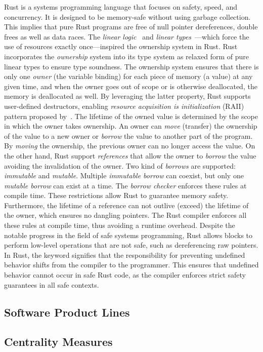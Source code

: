 Rust is a systems programming language that focuses on safety, speed, and concurrency. It is designed to be memory-safe without using garbage collection. 
This implies that pure Rust programs are free of null pointer dereferences, double frees as well as data races.
The \emph{linear logic}~\cite{Girard87, Girard95} and \emph{linear types}~\cite{Wadler90, Odersky92}---which force the use of resources exactly once---inspired the ownership system in Rust.
Rust incorporates the \emph{ownership} system into its type system as relaxed form of pure linear types to ensure type soundness.
The ownership system ensures that there is only one \emph{owner} (the variable binding) for each piece of memory (a value) at any given time, and when the owner goes out of scope or is otherwise deallocated, the memory is deallocated as well. By leveraging the latter property, Rust supports user-defined destructors, enabling \emph{resource acquisition is initialization} (RAII) pattern proposed by~\citet{Stroustrup94}.
The lifetime of the owned value is determined by the scope in which the owner takes ownership.
An owner can \emph{move} (transfer) the ownership of the value to a new owner or \emph{borrow} the value to another part of the program.
By \emph{moving} the ownership, the previous owner can no longer access the value.
On the other hand, Rust support \emph{references} that allow the owner to \emph{borrow} the value avoiding the invalidation of the owner.
Two kind of \emph{borrows} are supported: \emph{immutable} and \emph{mutable}.
Multiple \emph{immutable borrow} can coexist, but only one \emph{mutable borrow} can exist at a time. The \emph{borrow checker} enforces these rules at compile time.
These restrictions allow Rust to guarantee memory safety. Furthermore, the lifetime of a reference can not outlive (exceed) the lifetime of the owner, which ensures no dangling pointers.
The Rust compiler enforces all these rules at compile time, thus avoiding a runtime overhead.
Despite the notable progress in the field of safe systems programming, Rust allows  blocks to perform low-level operations that are not safe, such as dereferencing raw pointers.
In Rust, the  keyword signifies that the responsibility for preventing undefined behavior shifts from the compiler to the programmer. This ensures that undefined behavior cannot occur in safe Rust code, as the compiler enforces strict safety guarantees in all safe contexts.

\subsection{Software Product Lines}\label{subsec:bg:spl}


\subsection{Centrality Measures}\label{subsec:bg:centrality}


